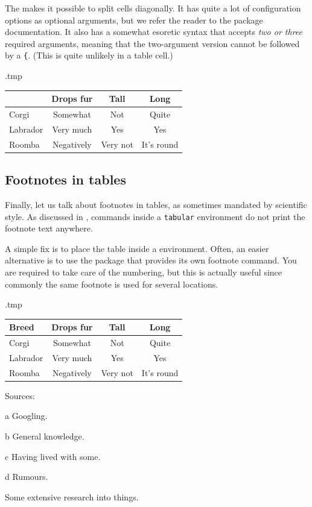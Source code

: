 The  makes it possible to split cells diagonally.
It has quite a lot of configuration options as optional arguments,
but we refer the reader to the package documentation.
It also has a somewhat esoretic syntax that accepts \emph{two or three} required arguments,
meaning that the two-argument version cannot be followed by a \verb|{|.
(This is quite unlikely in a table cell.)
%
\begin{VerbatimOut}{\jobname.tmp}
\centering
\begin{tabular}{l|ccc}
  \diagbox{Breed}{Property} & Drops fur & Tall & Long\\
  \hline
  Corgi & Somewhat & Not & Quite\\
  Labrador & Very much & Yes & Yes\\
  Roomba & Negatively & Very not & It's round
\end{tabular}
\end{VerbatimOut}
\ShowExampleBelow



%
%
\subsection{Footnotes in tables}\label{sec:table footnotes}

Finally, let us talk about footnotes in tables,
as sometimes mandated by scientific style.
As discussed in ,
 commands inside a \verb|tabular| environment
do not print the footnote text anywhere.

A simple fix is to place the table inside a  environment.
Often, an easier alternative is to use the  package
that provides its own footnote command.
You are required to take care of the numbering,
but this is actually useful since commonly the same footnote is used for several locations.
%
\begin{VerbatimOut}{\jobname.tmp}
\centering
\begin{threeparttable}
\begin{tabular}{l|ccc}
  Breed & Drops fur & Tall & Long\\
  \hline
  Corgi & Somewhat\tnote{a} & Not\tnote{b} & Quite\tnote{b}\\
  Labrador & Very much\tnote{c} & Yes\tnote{b,c} & Yes\tnote{b,c}\\
  Roomba & Negatively\tnote{d} & Very not\tnote{b} & It's round\tnote{b}
\end{tabular}
\begin{tablenotes}[para]
  \item[] Sources:
  \item[a] Googling.
  \item[b] General knowledge.
  \item[c] Having lived with some.
  \item[d] Rumours.
\end{tablenotes}
\caption{Some extensive research into things.}
\end{threeparttable}
\end{VerbatimOut}
\ShowExampleBelow


